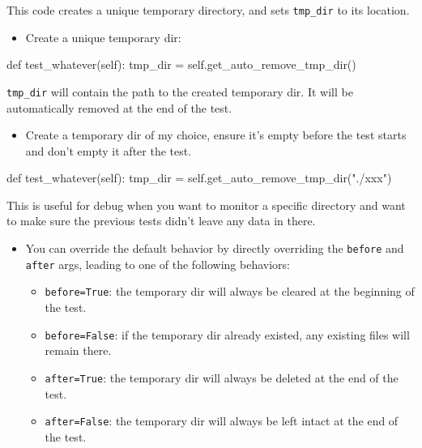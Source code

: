 \documentclass[
]{report}
\newenvironment{Shaded}{\begin{snugshade}}{\end{snugshade}}
\newcommand{\KeywordTok}[1]{\textcolor[rgb]{0.00,0.23,0.31}{#1}}
\newcommand{\NormalTok}[1]{\textcolor[rgb]{0.00,0.23,0.31}{#1}}
\newcommand{\OperatorTok}[1]{\textcolor[rgb]{0.37,0.37,0.37}{#1}}
\newcommand{\StringTok}[1]{\textcolor[rgb]{0.13,0.47,0.30}{#1}}
\newcommand{\VariableTok}[1]{\textcolor[rgb]{0.07,0.07,0.07}{#1}}
\providecommand{\tightlist}{%
  \setlength{\itemsep}{0pt}\setlength{\parskip}{0pt}}\usepackage{longtable,booktabs,array}
\begin{document}
This code creates a unique temporary directory, and sets
\texttt{tmp\_dir} to its location.

\begin{itemize}
\tightlist
\item
  Create a unique temporary dir:
\end{itemize}

\begin{Shaded}
\begin{Highlighting}[]
\KeywordTok{def}\NormalTok{ test\_whatever(}\VariableTok{self}\NormalTok{):}
\NormalTok{    tmp\_dir }\OperatorTok{=} \VariableTok{self}\NormalTok{.get\_auto\_remove\_tmp\_dir()}
\end{Highlighting}
\end{Shaded}

\texttt{tmp\_dir} will contain the path to the created temporary dir. It
will be automatically removed at the end of the test.

\begin{itemize}
\tightlist
\item
  Create a temporary dir of my choice, ensure it's empty before the test
  starts and don't empty it after the test.
\end{itemize}

\begin{Shaded}
\begin{Highlighting}[]
\KeywordTok{def}\NormalTok{ test\_whatever(}\VariableTok{self}\NormalTok{):}
\NormalTok{    tmp\_dir }\OperatorTok{=} \VariableTok{self}\NormalTok{.get\_auto\_remove\_tmp\_dir(}\StringTok{"./xxx"}\NormalTok{)}
\end{Highlighting}
\end{Shaded}

This is useful for debug when you want to monitor a specific directory
and want to make sure the previous tests didn't leave any data in there.

\begin{itemize}
\item
  You can override the default behavior by directly overriding the
  \texttt{before} and \texttt{after} args, leading to one of the
  following behaviors:

  \begin{itemize}
  \tightlist
  \item
    \texttt{before=True}: the temporary dir will always be cleared at
    the beginning of the test.
  \item
    \texttt{before=False}: if the temporary dir already existed, any
    existing files will remain there.
  \item
    \texttt{after=True}: the temporary dir will always be deleted at the
    end of the test.
  \item
    \texttt{after=False}: the temporary dir will always be left intact
    at the end of the test.
  \end{itemize}
\end{itemize}
\end{document}
